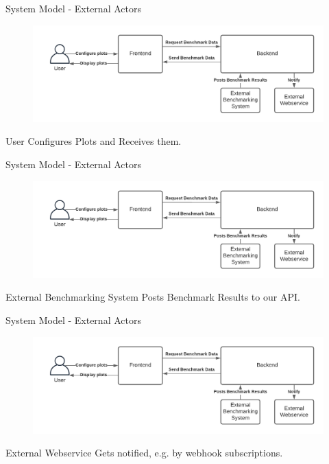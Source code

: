 \begin{frame}{System Model - External Actors}
    \begin{figure}[H]
        \includegraphics[width=\textwidth]{images/systemmodel_light_overview.pdf}
        \label{fig:lightoverview}
    \end{figure}

    \begin{block}{User}
        Configures Plots and Receives them.
    \end{block}
\end{frame}


\begin{frame}{System Model - External Actors}
    \begin{figure}[H]
        \includegraphics[width=\textwidth]{images/systemmodel_light_overview.pdf}
        \label{fig:lightoverview}
    \end{figure}

    \begin{block}{External Benchmarking System}
        Posts Benchmark Results to our API.
    \end{block}
\end{frame}


\begin{frame}{System Model - External Actors}
    \begin{figure}[H]
        \includegraphics[width=\textwidth]{images/systemmodel_light_overview.pdf}
        \label{fig:lightoverview}
    \end{figure}

    \begin{block}{External Webservice}
        Gets notified, e.g. by webhook subscriptions.
    \end{block}
\end{frame}